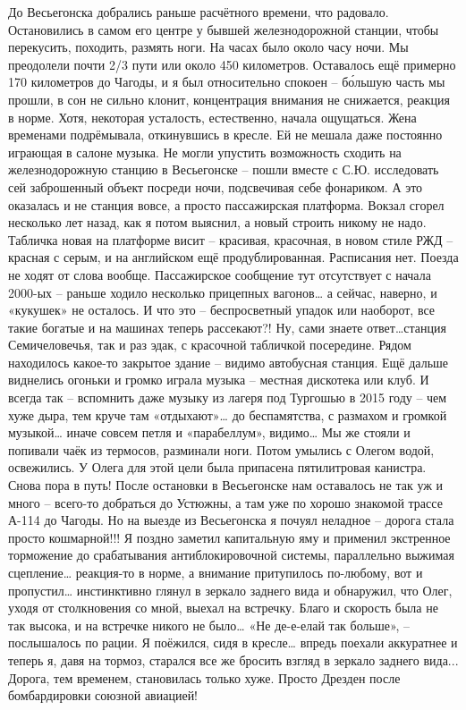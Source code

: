 До Весьегонска добрались раньше расчётного времени, что радовало. Остановились в самом его центре у бывшей железнодорожной станции, чтобы перекусить, походить, размять ноги. На часах было около часу ночи. Мы преодолели почти 2/3 пути или около 450 километров. Оставалось ещё примерно 170 километров до Чагоды, и я был относительно спокоен – бо́льшую часть мы прошли, в сон не сильно клонит, концентрация внимания не снижается, реакция в норме. Хотя, некоторая усталость, естественно, начала ощущаться. Жена временами подрёмывала, откинувшись в кресле. Ей не мешала даже постоянно играющая в салоне музыка. 
Не могли упустить возможность сходить на железнодорожную станцию в Весьегонске – пошли вместе с С.Ю. исследовать сей заброшенный объект посреди ночи, подсвечивая себе фонариком. А это оказалась и не станция вовсе, а просто пассажирская платформа. Вокзал сгорел несколько лет назад, как я потом выяснил, а новый строить никому не надо. Табличка новая на платформе висит – красивая, красочная, в новом стиле РЖД – красная с серым, и на английском ещё продублированная. Расписания нет. Поезда не ходят от слова вообще. Пассажирское сообщение тут отсутствует с начала 2000-ых  – раньше ходило несколько прицепных вагонов… а сейчас, наверно, и «кукушек» не осталось. И что это – беспросветный упадок или наоборот, все такие богатые и на машинах теперь рассекают?! Ну, сами знаете ответ…станция Семичеловечья, так и раз эдак, с красочной табличкой посередине.
Рядом находилось какое-то закрытое здание – видимо автобусная станция. Ещё дальше виднелись огоньки и громко играла музыка – местная дискотека или клуб. И всегда так – вспомнить даже музыку из лагеря под Тургошью в 2015 году – чем хуже дыра, тем круче там «отдыхают»… до беспамятства, с размахом и громкой музыкой… иначе совсем петля и «парабеллум», видимо… Мы же стояли и попивали чаёк из термосов, разминали ноги. Потом умылись с Олегом водой, освежились. У Олега для этой цели была припасена пятилитровая канистра. Снова пора в путь!
После остановки в Весьегонске нам оставалось не так уж и много – всего-то добраться до Устюжны, а там уже по хорошо знакомой трассе А-114 до Чагоды. Но на выезде из Весьегонска я почуял неладное – дорога стала просто кошмарной!!! Я поздно заметил капитальную яму и применил экстренное торможение до срабатывания антиблокировочной системы, параллельно выжимая сцепление… реакция-то в норме, а внимание притупилось по-любому, вот и пропустил… инстинктивно глянул в зеркало заднего вида и обнаружил, что Олег, уходя от столкновения со мной, выехал на встречку. Благо и скорость была не так высока, и на встречке никого не было… «Не де-е-елай так больше», – послышалось по рации. Я поёжился, сидя в кресле… впредь поехали аккуратнее и теперь я, давя на тормоз, старался все же бросить взгляд в зеркало заднего вида... Дорога, тем временем, становилась только хуже. Просто Дрезден после бомбардировки союзной авиацией! 
